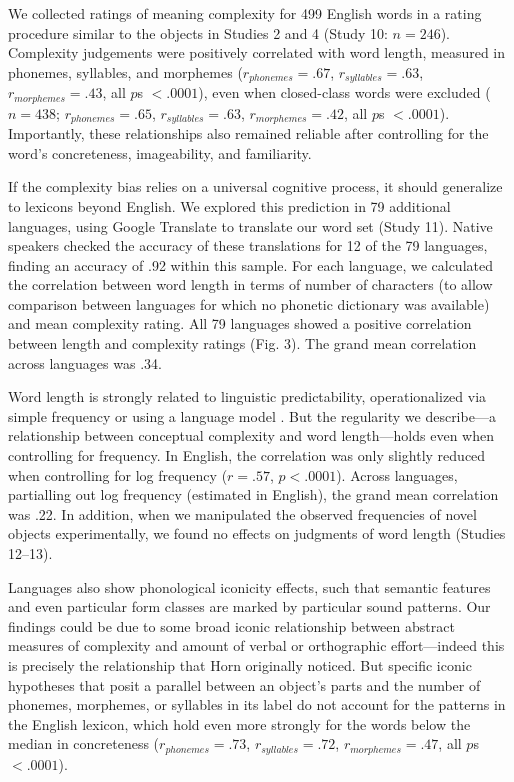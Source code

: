 \documentclass[12pt]{article}
\begin{document}
We collected ratings of meaning complexity for 499 English words  in a rating procedure similar to the objects in Studies 2 and 4 (Study 10: $n = 246$). Complexity judgements were positively correlated with word length, measured in phonemes, syllables, and morphemes ($r_{phonemes} = .67$, $r_{syllables} = .63$, $r_{morphemes} = .43$, all $p$s $< .0001$), even when closed-class words were excluded ($n = 438$; $r_{phonemes} = .65$, $r_{syllables} = .63$, $r_{morphemes} = .42$, all $p$s $< .0001$). Importantly, these relationships also remained reliable after controlling for the word's concreteness, imageability, and familiarity. 
						
If the complexity bias relies on a universal cognitive process, it should generalize to lexicons beyond English. We explored this prediction in 79 additional languages, using Google Translate to translate our word set (Study 11). Native speakers checked the accuracy of these translations for 12 of the 79 languages, finding an accuracy of .92 within this sample. For each language, we calculated the correlation between word length in terms of number of characters (to allow comparison between languages for which no phonetic dictionary was available) and mean complexity rating. All 79 languages showed a positive correlation between length and complexity ratings (Fig. 3). The grand mean correlation across languages was .34. 
					

Word length is strongly related to linguistic predictability, operationalized via simple frequency \cite{zipf1936} or using a language model \cite{piantadosi2011a}. But the regularity we describe---a relationship between conceptual complexity and word length---holds even when controlling for frequency. In English, the correlation was only slightly reduced when controlling for log frequency ($r = .57$, $p < .0001$). Across languages, partialling out log frequency (estimated in English), the grand mean correlation was .22. In addition, when we manipulated the observed frequencies of novel objects experimentally, we found no effects on judgments of word length (Studies 12--13). 

Languages also show phonological iconicity effects, such that semantic features \cite{maurer2006shape} and even particular form classes \cite{farmer2006phonological} are marked by particular sound patterns. Our findings could be due to some broad iconic relationship between abstract measures of complexity and amount of verbal or orthographic effort---indeed this is precisely the relationship that Horn originally noticed. But specific iconic hypotheses that posit a parallel between an object's parts and the number of phonemes, morphemes, or syllables in its label do not account for the patterns in the English lexicon, which hold even more strongly for the words below the median in concreteness ($r_{phonemes}  = .73$, $r_{syllables} = .72$, $r_{morphemes} = .47$, all $p$s $< .0001$). 
\end{document}
